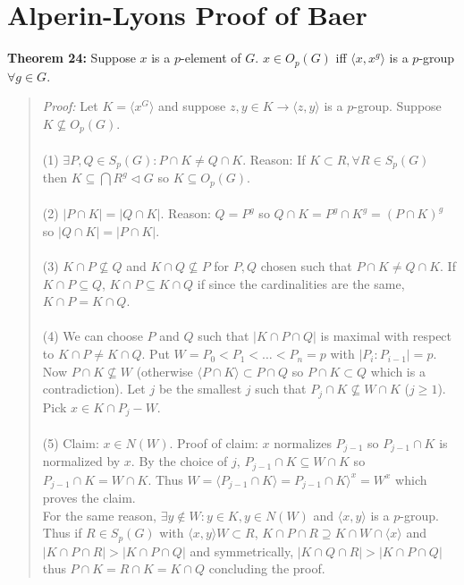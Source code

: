 \section{Alperin-Lyons Proof of Baer}
{\bf Theorem 24:}  Suppose $x$ is a $p$-element of $G$.  
$x \in O_p(G)$ iff $ \langle x, x^g \rangle $ is a $p$-group $\forall g \in G$.
\begin{quote}
\emph{Proof:}
Let $K= \langle x^G \rangle $ and suppose $z, y \in K \rightarrow \langle z, y \rangle $ 
is a $p$-group.  Suppose $K \nsubseteq O_p(G)$.
\\
\\
(1) $\exists P, Q \in S_p(G): P \cap K \ne Q \cap K$.  
Reason: If $K \subset R, \forall R \in S_p(G)$ then $K \subseteq  \bigcap R^g \lhd G$ so
$K \subseteq O_p(G)$.
\\
\\
(2) $|P \cap K| = |Q \cap K|$.  Reason: $Q= P^g$ so $Q \cap K= P^g \cap K^g= (P \cap K)^g$
so $|Q \cap K|= |P \cap K|$.
\\
\\
(3) $K \cap P \nsubseteq Q$ and $K \cap Q \nsubseteq P$ for $P, Q$ chosen such that
$P \cap K \ne Q \cap K$.  If $K \cap P \subseteq Q$, $K \cap P \subseteq K \cap Q$ if
since the cardinalities are the same, $K \cap P = K \cap Q$.
\\
\\
(4) We can choose $P$ and $Q$ such that $|K \cap P \cap Q|$ is maximal with respect to
$K \cap P \ne K \cap Q$.  Put $W=P_0< P_1< \ldots < P_n=p$ with $|P_i:P_{i-1}|=p$.
Now $P \cap K \nsubseteq W$ (otherwise $ \langle P \cap K \rangle \subset P \cap Q$ so 
$P \cap K \subset Q$
which is a contradiction).
Let $j$ be the smallest $j$ such that $P_j \cap K \nsubseteq W \cap K$ ($ j \ge 1$).  Pick
$x \in K\cap P_j-W$.
\\
\\
(5) Claim: $x \in N(W)$.  Proof of claim: $x$ normalizes $P_{j-1}$ so $P_{j-1} \cap K$
is normalized by $x$.  By the choice of $j$, $P_{j-1} \cap K \subseteq W \cap K$ so
$P_{j-1} \cap K = W \cap K$.  
Thus $W= \langle P_{j-1} \cap K \rangle = P_{j-1} \cap K \rangle^x= W^x$ which
proves the claim.\\
For the same reason, $\exists y \notin W: y \in K, y \in N(W)$ and 
$ \langle x, y \rangle $ is a $p$-group.
Thus if $R \in S_p(G)$ with $ \langle x, y \rangle W  \subset R$,
$K \cap P \cap R \supseteq K \cap W \cap \langle x \rangle $ and 
$|K \cap P \cap R| > |K \cap P \cap Q|$
and symmetrically,
$|K \cap Q \cap R| > |K \cap P \cap Q|$ thus $P \cap K = R \cap K= K \cap Q$ concluding the proof.
\end{quote}

